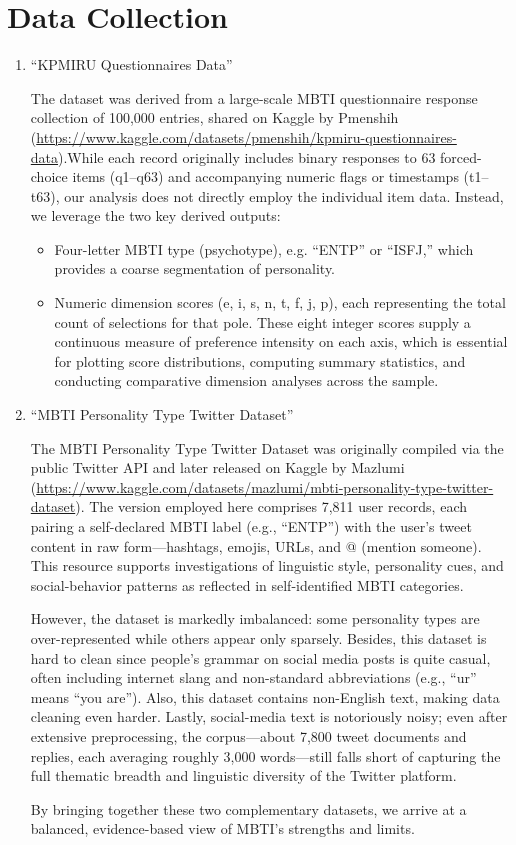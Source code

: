 \documentclass[12pt]{article}
\numberwithin{figure}{section}  %
\begin{document}
	\section{Data Collection}
	\begin{enumerate}
		\item  “KPMIRU Questionnaires Data”
		
		The dataset was derived from a large-scale MBTI questionnaire response collection of 100,000 entries, shared on Kaggle by Pmenshih
		 (\url{https://www.kaggle.com/datasets/pmenshih/kpmiru-questionnaires-data}).While each record originally includes binary responses to 63 forced-choice items (q1–q63) and accompanying numeric flags or timestamps (t1–t63),
		  our analysis does not directly employ the individual item data. Instead, we leverage the two key derived outputs:
		\begin{itemize}
			\item Four-letter MBTI type (psychotype), e.g. “ENTP” or “ISFJ,” 
			which provides a coarse segmentation of personality.
			\item Numeric dimension scores (e, i, s, n, t, f, j, p), each representing the total count of selections for that pole.
			 These eight integer scores supply a continuous measure of preference intensity on each axis, which is essential for plotting score distributions, 
			computing summary statistics, and conducting comparative dimension analyses across the sample.  
			   
		\end{itemize}
		\item “MBTI Personality Type Twitter Dataset”
		
		The MBTI Personality Type Twitter Dataset 
		was originally compiled via the public Twitter API and later released on Kaggle by Mazlumi
		(\url{https://www.kaggle.com/datasets/mazlumi/mbti-personality-type-twitter-dataset}). The version employed here comprises 7,811 user records, each pairing a self-declared MBTI label (e.g., “ENTP”)
		 with the user’s tweet content in raw form—hashtags, emojis, URLs, and @ (mention someone). This resource supports investigations of linguistic style, personality cues,
		  and social-behavior patterns as reflected in self-identified MBTI categories.

		However, the dataset is markedly imbalanced: some personality types are over-represented while others appear only sparsely.
		 Besides, this dataset is hard to clean since people's grammar on social media posts is quite casual, often including internet slang and non-standard abbreviations (e.g., “ur” means “you are”). Also, this dataset contains non-English text, making data cleaning even harder. Lastly, social-media text is notoriously noisy;
		 even after extensive preprocessing, the corpus—about 7,800 tweet documents and replies, each averaging roughly 3,000 words—still falls short of capturing the full thematic breadth and linguistic diversity of the Twitter platform.
		
		By bringing together these two complementary datasets, we arrive at a balanced, evidence-based view of MBTI’s strengths and limits.
	
	\end{enumerate}
\end{document}
